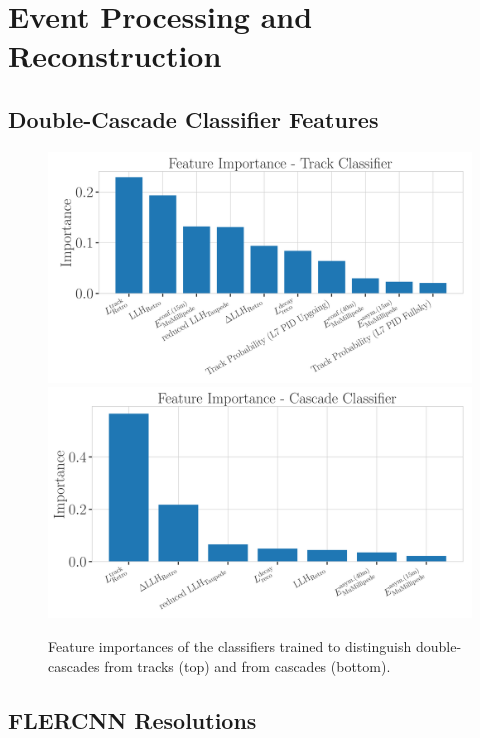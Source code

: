 \chapter{Event Processing and Reconstruction}

\section{Double-Cascade Classifier Features} 

\begin{figure}[h]
    \includegraphics[width=0.8\linewidth]{figures/results/190607/classification/track_feature_importance.png}
    \includegraphics[width=0.8\linewidth]{figures/results/190607/classification/cascade_feature_importance.png}
    \caption[Double-cascade classifiers feature importances]{Feature importances of the  classifiers trained to distinguish double-cascades from tracks (top) and from cascades (bottom).}
\end{figure}


\section{FLERCNN Resolutions} 

